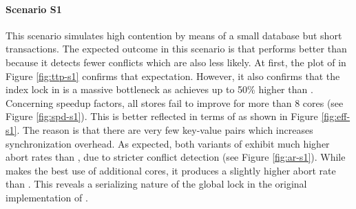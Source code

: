 \clearpage

\paragraph{Scenario S1}

This scenario simulates high contention by means of a small database but short
transactions. The expected outcome in this scenario is that \echo performs
better than \midas because it detects fewer conflicts which are also less
likely. At first, the plot of \ttp in Figure \ref{fig:ttp-s1} confirms that
expectation. However, it also confirms that the index lock in \midas is a
massive bottleneck as \midasopt achieves up to 50\% higher \tput than \echo.
Concerning speedup factors, all stores fail to improve for more than 8 cores
(see Figure \ref{fig:spd-s1}). This is better reflected in terms of \eff as
shown in Figure \ref{fig:eff-s1}. The reason is that there are very few
key-value pairs which increases synchronization overhead. As expected, both
variants of \midas exhibit much higher abort rates than \echo, due to stricter
conflict detection (see Figure \ref{fig:ar-s1}). While \midasopt makes the best
use of additional cores, it produces a slightly higher abort rate than \midas.
This reveals a serializing nature of the global lock in the original
implementation of \midas.

